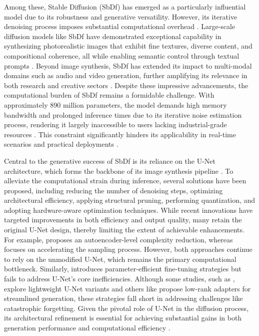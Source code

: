 \documentclass[a4paper,fleqn]{ieeetj}
\begin{document}
Among these, Stable Diffusion (SbDf) has emerged as a particularly influential model due to its robustness and generative versatility. However, its iterative denoising process imposes substantial computational overhead \cite{gandikota2023erasing}. Large-scale diffusion models like SbDf have demonstrated exceptional capability in synthesizing photorealistic images that exhibit fine textures, diverse content, and compositional coherence, all while enabling semantic control through textual prompts \cite{kim2025bk}. Beyond image synthesis, SbDf has extended its impact to multi-modal domains such as audio and video generation, further amplifying its relevance in both research and creative sectors \cite{jeong2023power}. Despite these impressive advancements, the computational burden of SbDf remains a formidable challenge. With approximately 890 million parameters, the model demands high memory bandwidth and prolonged inference times due to its iterative noise estimation process, rendering it largely inaccessible to users lacking industrial-grade resources \cite{han2023svdiff, li2023q}. This constraint significantly hinders its applicability in real-time scenarios and practical deployments \cite{zhao2025mixdq}.

Central to the generative success of SbDf is its reliance on the U-Net architecture, which forms the backbone of its image synthesis pipeline \cite{wu2024medsegdiff}. To alleviate the computational strain during inference, several solutions have been proposed, including reducing the number of denoising steps, optimizing architectural efficiency, applying structural pruning, performing quantization, and adopting hardware-aware optimization techniques. While recent innovations have targeted improvements in both efficiency and output quality, many retain the original U-Net design, thereby limiting the extent of achievable enhancements. For example, \cite{sadat2024litevae} proposes an autoencoder-level complexity reduction, whereas \cite{zhao2025mobilediffusion} focuses on accelerating the sampling process. However, both approaches continue to rely on the unmodified U-Net, which remains the primary computational bottleneck. Similarly, \cite{han2023svdiff} introduces parameter-efficient fine-tuning strategies but fails to address U-Net’s core inefficiencies. Although some studies, such as \cite{kim2025bk}, explore lightweight U-Net variants and others like \cite{smith2023continual} propose low-rank adapters for streamlined generation, these strategies fall short in addressing challenges like catastrophic forgetting. Given the pivotal role of U-Net in the diffusion process, its architectural refinement is essential for achieving substantial gains in both generation performance and computational efficiency \cite{wang2024edit}.
\end{document}
